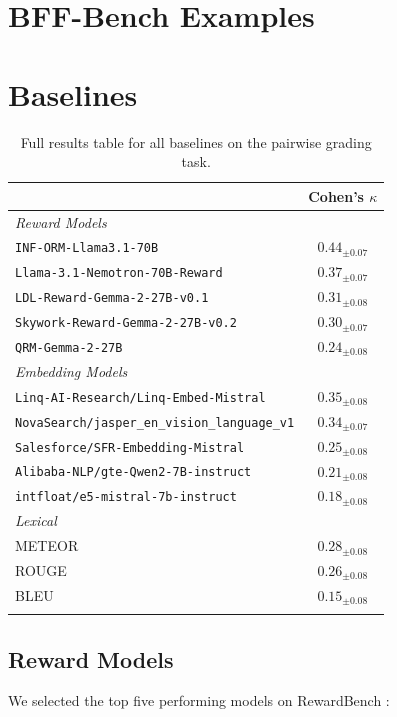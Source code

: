 \section{BFF-Bench Examples}
\label{sec:bff-bench-examples}




\section{Baselines}
\label{sec:baselines}

\begin{table}[ht]
\centering
\begin{tabular}{lc}
\toprule
 & Cohen's $\kappa$ \\
 \midrule
\textit{Reward Models} & \\
\texttt{INF-ORM-Llama3.1-70B} & $0.44_{\pm 0.07 }$ \\
\texttt{Llama-3.1-Nemotron-70B-Reward} & $0.37_{\pm 0.07 }$ \\
\texttt{LDL-Reward-Gemma-2-27B-v0.1} & $0.31_{\pm 0.08 }$ \\
\texttt{Skywork-Reward-Gemma-2-27B-v0.2} & $0.30_{\pm 0.07 }$ \\
\texttt{QRM-Gemma-2-27B} & $0.24_{\pm 0.08 }$ \\
\midrule
\textit{Embedding Models} & \\
\texttt{Linq-AI-Research/Linq-Embed-Mistral} & $0.35_{\pm 0.08 }$ \\
\texttt{NovaSearch/jasper\_en\_vision\_language\_v1} & $0.34_{\pm 0.07 }$ \\
\texttt{Salesforce/SFR-Embedding-Mistral} & $0.25_{\pm 0.08 }$ \\
\texttt{Alibaba-NLP/gte-Qwen2-7B-instruct} & $0.21_{\pm 0.08 }$ \\
\texttt{intfloat/e5-mistral-7b-instruct} & $0.18_{\pm 0.08 }$ \\
\midrule
\textit{{Lexical}} & \\
METEOR & $0.28_{\pm 0.08 }$ \\
ROUGE & $0.26_{\pm 0.08 }$ \\
BLEU & $0.15_{\pm 0.08 }$ \\
\bottomrule
\label{tab:baseline_perf}
\end{tabular}

\caption{Full results table for all baselines on the pairwise grading task.}
\end{table}

\subsection{Reward Models}
We selected the top five performing models on RewardBench \cite{RewardBench}: 

